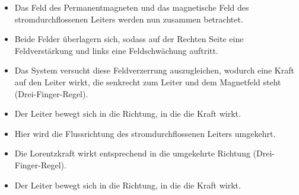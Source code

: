 \begin{frame}
{		\begin{minipage}{0.25\textwidth}
		\end{minipage}
		\begin{minipage}{0.74\textwidth}
			\begin{itemize}
				\item Das Feld des Permanentmagneten und das magnetische Feld des stromdurchflossenen Leiters werden nun zusammen betrachtet.
				\item Beide Felder überlagern sich, sodass auf der Rechten Seite eine Feldverstärkung und links eine Feldschwächung auftritt.
				\item Das System versucht diese Feldverzerrung auszugleichen, wodurch eine Kraft auf den Leiter wirkt, die senkrecht zum Leiter und dem Magnetfeld steht (Drei-Finger-Regel).
				\item Der Leiter bewegt sich in die Richtung, in die die Kraft wirkt.
			\end{itemize}
		\end{minipage}
		\begin{minipage}{0.25\textwidth}
		\end{minipage}
		\begin{minipage}{0.74\textwidth}
			\begin{itemize}
				\item Hier wird die Flussrichtung des stromdurchflossenen Leiters umgekehrt.
				\item Die Lorentzkraft wirkt entsprechend in die umgekehrte Richtung (Drei-Finger-Regel).
				\item Der Leiter bewegt sich in die Richtung, in die die Kraft wirkt.

\end{itemize}
\end{minipage}}
\end{frame}
